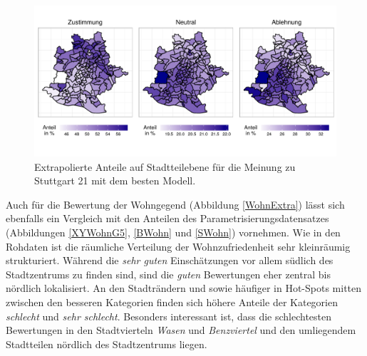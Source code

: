 \documentclass{Vorlage}
\begin{document}
\begin{figure}[h]
 \begin{center}
 \includegraphics[scale=0.8]{Pictures/S21Extra}
 \caption{Extrapolierte Anteile auf Stadtteilebene für die Meinung zu Stuttgart 21 mit dem besten Modell.}
 \label{S21Extra}
 \end{center}
\end{figure}

Auch für die Bewertung der Wohngegend (Abbildung \ref{WohnExtra}) lässt sich ebenfalls ein Vergleich mit den Anteilen des Parametrisierungsdatensatzes (Abbildungen \ref{XYWohnG5}, \ref{BWohn} und \ref{SWohn}) vornehmen. Wie in den Rohdaten ist die räumliche Verteilung der Wohnzufriedenheit sehr kleinräumig strukturiert. Während die \textit{sehr guten} Einschätzungen vor allem südlich des Stadtzentrums zu finden sind, sind die \textit{guten} Bewertungen eher zentral bis nördlich lokalisiert. An den Stadträndern und sowie häufiger in Hot-Spots mitten zwischen den besseren Kategorien finden sich höhere Anteile der Kategorien \textit{schlecht} und \textit{sehr schlecht}. Besonders interessant ist, dass die schlechtesten Bewertungen in den Stadtvierteln \textit{Wasen} und \textit{Benzviertel} und den umliegendem Stadtteilen nördlich des Stadtzentrums liegen.
\end{document}
